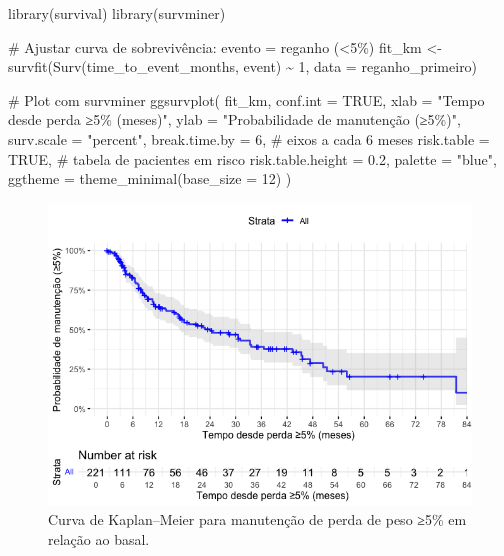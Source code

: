 \documentclass[
]{article}
\newenvironment{Shaded}{\begin{snugshade}}{\end{snugshade}}
\newcommand{\AttributeTok}[1]{\textcolor[rgb]{0.40,0.45,0.13}{#1}}
\newcommand{\CommentTok}[1]{\textcolor[rgb]{0.37,0.37,0.37}{#1}}
\newcommand{\ConstantTok}[1]{\textcolor[rgb]{0.56,0.35,0.01}{#1}}
\newcommand{\DecValTok}[1]{\textcolor[rgb]{0.68,0.00,0.00}{#1}}
\newcommand{\FloatTok}[1]{\textcolor[rgb]{0.68,0.00,0.00}{#1}}
\newcommand{\FunctionTok}[1]{\textcolor[rgb]{0.28,0.35,0.67}{#1}}
\newcommand{\NormalTok}[1]{\textcolor[rgb]{0.00,0.23,0.31}{#1}}
\newcommand{\OtherTok}[1]{\textcolor[rgb]{0.00,0.23,0.31}{#1}}
\newcommand{\SpecialCharTok}[1]{\textcolor[rgb]{0.37,0.37,0.37}{#1}}
\newcommand{\StringTok}[1]{\textcolor[rgb]{0.13,0.47,0.30}{#1}}
\begin{document}
\begin{Shaded}
\begin{Highlighting}[]
\FunctionTok{library}\NormalTok{(survival)}
\FunctionTok{library}\NormalTok{(survminer)}

\CommentTok{\# Ajustar curva de sobrevivência: evento = reganho (\textless{}5\%)}
\NormalTok{fit\_km }\OtherTok{\textless{}{-}} \FunctionTok{survfit}\NormalTok{(}\FunctionTok{Surv}\NormalTok{(time\_to\_event\_months, event) }\SpecialCharTok{\textasciitilde{}} \DecValTok{1}\NormalTok{, }\AttributeTok{data =}\NormalTok{ reganho\_primeiro)}

\CommentTok{\# Plot com survminer}
\FunctionTok{ggsurvplot}\NormalTok{(}
\NormalTok{  fit\_km,}
  \AttributeTok{conf.int =} \ConstantTok{TRUE}\NormalTok{,}
  \AttributeTok{xlab =} \StringTok{"Tempo desde perda ≥5\% (meses)"}\NormalTok{,}
  \AttributeTok{ylab =} \StringTok{"Probabilidade de manutenção (≥5\%)"}\NormalTok{,}
  \AttributeTok{surv.scale =} \StringTok{"percent"}\NormalTok{,}
  \AttributeTok{break.time.by =} \DecValTok{6}\NormalTok{,     }\CommentTok{\# eixos a cada 6 meses}
  \AttributeTok{risk.table =} \ConstantTok{TRUE}\NormalTok{,     }\CommentTok{\# tabela de pacientes em risco}
  \AttributeTok{risk.table.height =} \FloatTok{0.2}\NormalTok{,}
  \AttributeTok{palette =} \StringTok{"blue"}\NormalTok{,}
  \AttributeTok{ggtheme =} \FunctionTok{theme\_minimal}\NormalTok{(}\AttributeTok{base\_size =} \DecValTok{12}\NormalTok{)}
\NormalTok{)}
\end{Highlighting}
\end{Shaded}

\begin{figure}[H]

{\centering \includegraphics[width=1\textwidth,height=\textheight]{outputs/figs/km-manutencao-5-1.png}

}

\caption{Curva de Kaplan--Meier para manutenção de perda de peso ≥5\% em
relação ao basal.}

\end{figure}%
\end{document}
